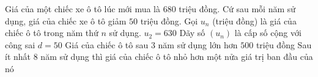 \begin{ex}%
	Giá của một chiếc xe ô tô lúc mới mua là $680$ triệu  đồng. Cứ sau mỗi năm sử dụng, giá của chiếc xe ô tô giảm $50$ triệu đồng. Gọi $u_n$ (triệu đồng) là giá của chiếc ô tô trong năm thứ $n$ sử dụng.
	 \choiceTF
		{\True $u_2=630$} 
		{Dãy số  $(u_n)$ là cấp số cộng với công sai $d=50$}
		{\True Giá  của chiếc ô tô sau $3$ năm sử dụng lớn hơn $500$ triệu đồng}
		{Sau ít nhất $8$ năm sử dụng thì giá của chiếc ô tô nhỏ hơn một nửa giá trị ban đầu của nó} 
\end{ex}

